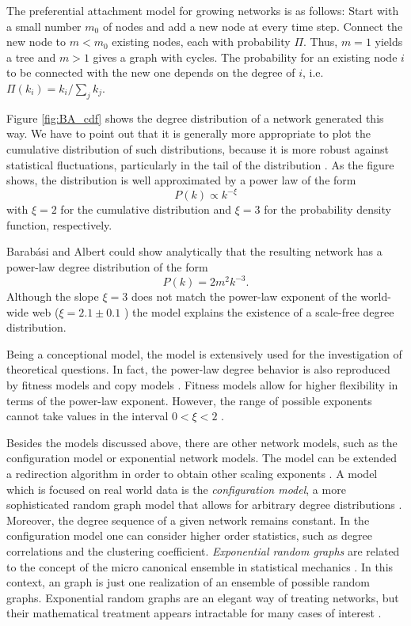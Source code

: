 The preferential attachment model for growing networks is as follows:
Start with a small number $m_0$ of nodes and add a new node at every time step.
Connect the new node to $m<m_0$ existing nodes, each with probability $\Pi $.
Thus, $m=1$ yields a tree and $m>1$ gives a graph with cycles.
The probability for an existing node $i$ to be connected with the new one depends on the degree of $i$, i.e. $\Pi (k_i)=k_i/\sum _j k_j$.

Figure \ref{fig:BA_cdf} shows the degree distribution of a network generated this way.
We have to point out that it is generally more appropriate to plot the cumulative distribution of such distributions, because it is more robust against statistical fluctuations, particularly in the tail of the distribution \citep{Clauset:2009}.
As the figure shows, the distribution is well approximated by a power law of the form
\[
P(k)\propto k^{-\xi }
\]
with $\xi =2$ for the cumulative distribution and $\xi = 3$ for the probability density function, respectively.

Barab\'asi and Albert could show analytically that the resulting network has a power-law degree distribution of the form
\begin{equation}\label{eq:BA_law}
P(k)=2m^2 k^{-3}.
\end{equation}
Although the slope $\xi = 3$ does not match the power-law exponent of the world-wide web ($\xi = 2.1\pm 0.1$ \citep{Barabasi99}) the model explains the existence of a scale-free degree distribution.

Being a conceptional model, the \BA model is extensively used for the investigation of theoretical questions.
In fact, the power-law degree behavior is also reproduced by fitness models \citep{Bianconi:2001,Fortunato:2006} and copy models \citep{Kleinberg99theweb}.
Fitness models allow for higher flexibility in terms of the power-law exponent.
However, the range of possible exponents cannot take values in the interval $0<\xi < 2$ \citep{all_scale_free_are_sparse}.

Besides the models discussed above, there are other network models, such as the configuration model or exponential network models.
The \BA model can be extended a redirection algorithm in order to obtain other scaling exponents \citep{Krapivsky:2001bg}.
A model which is focused on real world data is the \emph{configuration model}, a more sophisticated random graph model that allows for arbitrary degree distributions \citep{Newman:2001pa,Newman:book}.
Moreover, the degree sequence of a given network remains constant.
In the configuration model one can consider higher order statistics, such as degree correlations and the clustering coefficient.
\emph{Exponential random graphs} are related to the concept of the micro canonical ensemble in statistical mechanics \citep{Strauss:86}.
In this context, an \ER graph is just one realization of an ensemble of possible random graphs.
Exponential random graphs are an elegant way of treating networks, but their mathematical treatment appears intractable for many cases of interest \citep{Newman2003}.

